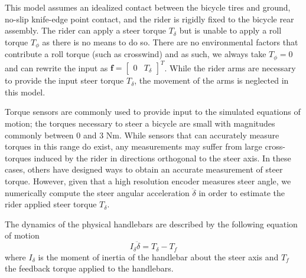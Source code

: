 \documentclass[11pt,a4paper,reqno]{amsart}
\newcommand{\roll}{\phi}
\newcommand{\steer}{\delta}
\begin{document}
This model assumes an idealized contact between the bicycle tires and ground, no-slip knife-edge point contact,
and the rider is rigidly fixed to the bicycle rear assembly.
The rider can apply a steer torque $ T_\steer $ but is unable to apply a roll torque $ T_\roll $ as there is no means to
do so.
There are no environmental factors that contribute a roll torque (such as crosswind) and as such,
we always take $ T_\roll = 0 $ and can rewrite the input as $ \bm{f} = \begin{bmatrix} 0  & T_\steer \end{bmatrix}^T $.
While the rider arms are necessary to provide the input steer torque $ T_\steer $, the movement of the arms is
neglected in this model.

Torque sensors are commonly used to provide input to the simulated equations of motion\cite{FIXME}; the torques
necessary to steer a bicycle are small with magnitudes commonly between 0 and 3 Nm\cite{moore2012}.
While sensors that can accurately measure torques in this range do exist, any measurements may suffer from large
cross-torques induced by the rider in directions orthogonal to the steer axis.
In these cases, others have designed ways to obtain an accurate measurement of steer torque\cite{moore2012}.
However, given that a high resolution encoder measures steer angle, we numerically compute the steer
angular acceleration $ \ddot{\steer} $ in order to estimate the rider applied steer torque $ T_\steer $.

The dynamics of the physical handlebars are described by the following equation of motion
\begin{equation}
    I_\steer \ddot{\steer} = T_\steer- T_f
\end{equation}
where $ I_\steer $ is the moment of inertia of the handlebar about the steer axis and $ T_f $ the feedback torque
applied to the handlebars.
\end{document}
